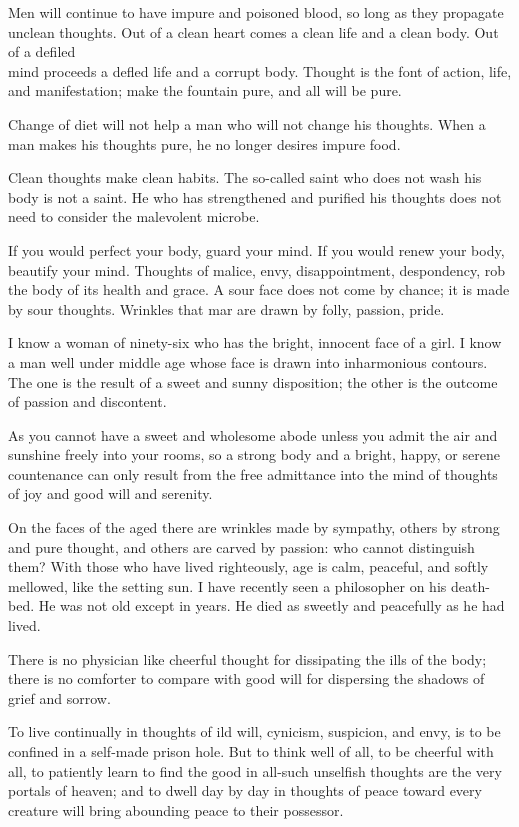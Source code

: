 \documentclass[10pt]{article}
\begin{document}
Men will continue to have impure and poisoned blood, so long as they propagate unclean thoughts. Out of a clean heart comes a clean life and a clean body. Out of a defiled\\
mind proceeds a defled life and a corrupt body. Thought is the font of action, life, and manifestation; make the fountain pure, and all will be pure.

Change of diet will not help a man who will not change his thoughts. When a man makes his thoughts pure, he no longer desires impure food.

Clean thoughts make clean habits. The so-called saint who does not wash his body is not a saint. He who has strengthened and purified his thoughts does not need to consider the malevolent microbe.

If you would perfect your body, guard your mind. If you would renew your body, beautify your mind. Thoughts of malice, envy, disappointment, despondency, rob the body of its health and grace. A sour face does not come by chance; it is made by sour thoughts. Wrinkles that mar are drawn by folly, passion, pride.

I know a woman of ninety-six who has the bright, innocent face of a girl. I know a man well under middle age whose face is drawn into inharmonious contours. The one is the result of a sweet and sunny disposition; the other is the outcome of passion and discontent.

As you cannot have a sweet and wholesome abode unless you admit the air and sunshine freely into your rooms, so a strong body and a bright, happy, or serene countenance can only result from the free admittance into the mind of thoughts of joy and good will and serenity.

On the faces of the aged there are wrinkles made by sympathy, others by strong and pure thought, and others are carved by passion: who cannot distinguish them? With those who have lived righteously, age is calm, peaceful, and softly mellowed, like the setting sun. I have recently seen a philosopher on his death-bed. He was not old except in years. He died as sweetly and peacefully as he had lived.

There is no physician like cheerful thought for dissipating the ills of the body; there is no comforter to compare with good will for dispersing the shadows of grief and sorrow.

To live continually in thoughts of ild will, cynicism, suspicion, and envy, is to be confined in a self-made prison hole. But to think well of all, to be cheerful with all, to patiently learn to find the good in all-such unselfish thoughts are the very portals of heaven; and to dwell day by day in thoughts of peace toward every creature will bring abounding peace to their possessor.
\end{document}
